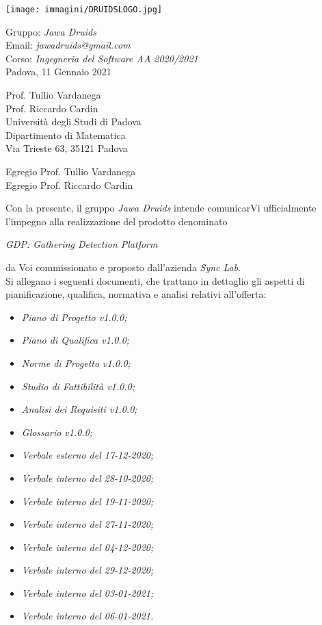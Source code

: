 \documentclass[a4paper,12pt]{report}
\begin{document}
\mbox{}
\vspace{-4cm}
\begin{center}
  \texttt{[image: immagini/DRUIDSLOGO.jpg]}
\end{center}
Gruppo: \textit{Jawa Druids} \\ Email: \textit{jawadruids@gmail.com}\\ Corso: \textit{Ingegneria del Software AA 2020/2021}\\Padova, 11 Gennaio 2021 \\
\begin{flushright}
  Prof. Tullio Vardanega \\
  Prof. Riccardo Cardin \\
  Università degli Studi di Padova \\
  Dipartimento di Matematica \\
  Via Trieste 63, 35121 Padova \\
\end{flushright}
Egregio Prof. Tullio Vardanega \\
Egregio Prof. Riccardo Cardin \\
\vspace{0.2cm}

Con la presente, il gruppo \textit{Jawa Druids} intende comunicarVi ufficialmente l’impegno alla realizzazione del prodotto denominato
\begin{center}
  \textit{GDP: Gathering Detection Platform}
\end{center}
da Voi commissionato e proposto dall'azienda \textit{Sync Lab}.
\vspace{1cm}
\\
Si allegano i seguenti documenti, che trattano in dettaglio gli aspetti di pianificazione, qualifica, normativa e analisi relativi all'offerta:
\begin{itemize}
  \item \textit{Piano di Progetto v1.0.0;}
  \item \textit{Piano di Qualifica v1.0.0;}
  \item \textit{Norme di Progetto v1.0.0;}
  \item \textit{Studio di Fattibilità v1.0.0;}
  \item \textit{Analisi dei Requisiti v1.0.0;}
  \item \textit{Glossario v1.0.0;}
  \item \textit{Verbale esterno del 17-12-2020;}
  \item \textit{Verbale interno del 28-10-2020;}
  \item \textit{Verbale interno del 19-11-2020;}
  \item \textit{Verbale interno del 27-11-2020;}
  \item \textit{Verbale interno del 04-12-2020;}
  \item \textit{Verbale interno del 29-12-2020;}
  \item \textit{Verbale interno del 03-01-2021;}
  \item \textit{Verbale interno del 06-01-2021.}
\end{itemize}
\vspace{0.7cm}
\end{document}

